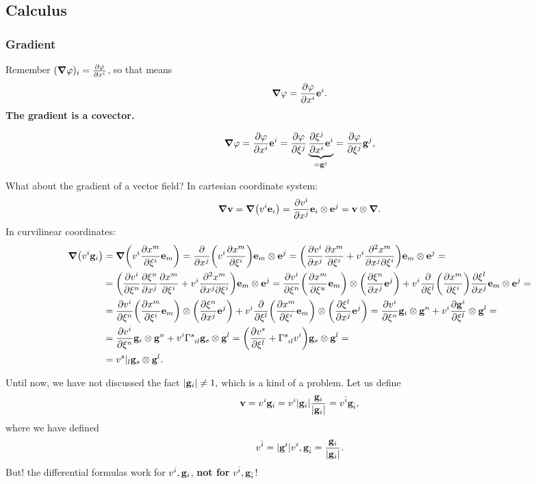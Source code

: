 \documentclass[reqno, a4paper]{article}
\begin{document}
\subsection{Calculus}
\label{sec:calculus}

\subsubsection{Gradient}
\label{sec:gradient}

Remember $(\grad \varphi)_i = \pdv{\varphi}{x^i}$, so that means
\[
	\grad \varphi = \pdv{\varphi}{x^i} \vb{e}^i.
\]
\textbf{The gradient is a covector.}

\[
	\grad \varphi = \pdv{\varphi}{x^i}\vb{e}^i = \pdv{\varphi}{\xi^j}\underbrace{\pdv{\xi^j}{x^i}\vb{e}^i}_{=\vb{g}^j} = \pdv{\varphi}{\xi^j}\vb{g}^j,
\]

What about the gradient of a vector field? In cartesian coordinate system:
\[
	\grad \vb{v} = \grad(v^i \vb{e}_i) = \pdv{v^i}{x^j}\vb{e}_i \otimes \vb{e}^j = \vb{v} \otimes \grad.
\]
In curvilinear coordinates:
\begin{align*}
	\grad(v^i \vb{g}_i)& = \grad \qty(v^i \pdv{x^m}{\xi^i}\vb{e}_m) = \pdv{x^j}\qty(v^i \pdv{x^m}{\xi^i})\vb{e}_m \otimes \vb{e}^j = \qty(\pdv{v^i}{x^j} \pdv{x^m}{\xi^i}+v^i \pdv[2]{x^m}{x^j}{\xi^i})\vb{e}_m \otimes \vb{e}^j = \\
			   & = \qty(\pdv{v^i}{\xi^n}\pdv{\xi^n}{x^j}\pdv{x^m}{\xi^i}+v^i \pdv[2]{x^m}{x^j}{\xi^i})\vb{e}_m \otimes \vb{e}^j = \pdv{v^i}{\xi^n} \qty(\pdv{x^m}{\xi^u}\vb{e}_m)\otimes \qty(\pdv{\xi^n}{x^j}\vb{e}^j)+v^i \pdv{\xi^l}\qty(\pdv{x^m}{\xi^i})\pdv{\xi^l}{x^j}\vb{e}_m \otimes \vb{e}^j = \\
			   & = \pdv{v^i}{\xi^n} \qty(\pdv{x^m}{\xi^i}\vb{e}_m)\otimes \qty(\pdv{\xi^n}{x^j}\vb{e}^j)+ v^i \pdv{\xi^l}\qty(\pdv{x^m}{\xi^i}\vb{e}_m)\otimes \qty(\pdv{\xi^l}{x^j}\vb{e}^j) = \pdv{v^i}{\xi^n}\vb{g}_i \otimes \vb{g}^n+ v^i \pdv{\vb{g}^i}{\xi^l} \otimes \vb{g}^l = \\
			   &= \pdv{v^i}{\xi^n}\vb{g}_i \otimes \vb{g}^n + v^i \Gamma \indices{^s_{il}}\vb{g}_s \otimes \vb{g}^l = \qty(\pdv{v^s}{\xi^l}+\Gamma \indices{^s_{il}}v^i)\vb{g}_s \otimes \vb{g}^l = \\
			    & = v^s|_l \vb{g}_s \otimes \vb{g}^l.
\end{align*}

Until now, we have not discussed the fact $|\vb{g}_i| \neq 1,$ which is a kind of a problem. Let us define
\[
	\vb{v}=v^i \vb{g}_i = v^i |\vb{g}_i| \frac{\vb{g}_i}{|\vb{g}_i|} = v^{\hat{i}} \vb{g}_{\hat{i}},
\]
where we have defined
\[
	v^{\hat{i}} = |\vb{g}^i| v^i, \vb{g}_{\hat{i}} = \frac{\vb{g}_i}{|\vb{g}_i|}.
\]
But! the differential formulas work for $v^i, \vb{g}_i$, \textbf{not for} $v^{\hat{i}}, \vb{g}_{\hat{i}}$!
\end{document}
